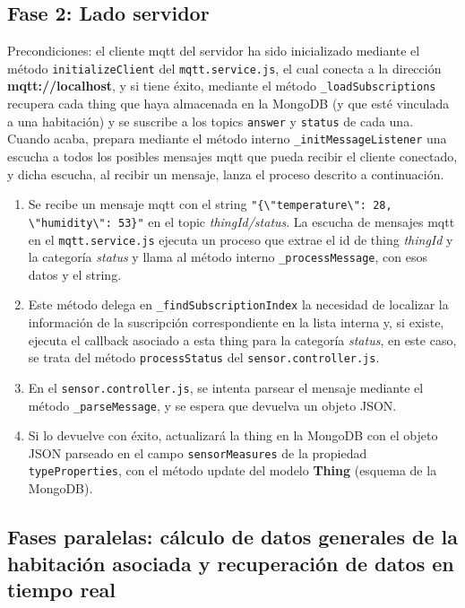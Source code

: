 \subsection{Fase 2: Lado servidor}
\label{ch:Capitulo5.4.2}
Precondiciones: el cliente \gls{mqtt} del servidor ha sido inicializado mediante el método \verb|initializeClient| del \verb|mqtt.service.js|, el cual conecta a la dirección \textbf{mqtt://localhost}, y si tiene éxito, mediante el método \verb|_loadSubscriptions| recupera cada thing que haya almacenada en la MongoDB (y que esté vinculada a una habitación) y se suscribe a los topics \verb|answer| y \verb|status| de cada una. Cuando acaba, prepara mediante el método interno \verb|_initMessageListener| una escucha a todos los posibles mensajes \gls{mqtt} que pueda recibir el cliente conectado, y dicha escucha, al recibir un mensaje, lanza el proceso descrito a continuación.

\begin{enumerate}
\item  Se recibe un mensaje \gls{mqtt} con el string \verb|"{\"temperature\": 28, \"humidity\": 53}"| en el topic \textit{thingId/status}. La escucha de mensajes \gls{mqtt} en el \verb|mqtt.service.js| ejecuta un proceso que extrae el id de thing \textit{thingId} y la categoría \textit{status} y llama al método interno \verb|_processMessage|, con esos datos y el string.

\item  Este método delega en \verb|_findSubscriptionIndex| la necesidad de localizar la información de la suscripción correspondiente en la lista interna y, si existe, ejecuta el callback asociado a esta thing para la categoría \textit{status}, en este caso, se trata del método \verb|processStatus| del \verb|sensor.controller.js|.

\item  En el \verb|sensor.controller.js|, se intenta parsear el mensaje mediante el método \verb|_parseMessage|, y se espera que devuelva un objeto JSON.

\item  Si lo devuelve con éxito, actualizará la thing en la MongoDB con el objeto JSON parseado en el campo \verb|sensorMeasures| de la propiedad \verb|typeProperties|, con el método update del modelo \textbf{Thing} (esquema de la MongoDB).
\end{enumerate}

\subsection{Fases paralelas: cálculo de datos generales de la habitación asociada y recuperación de datos en tiempo real}
\label{ch:Capitulo5.4.3}

